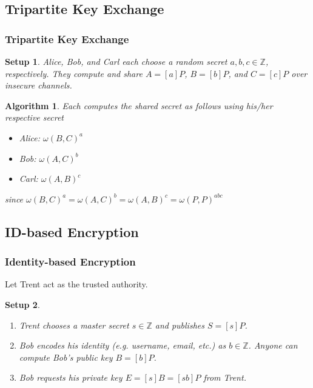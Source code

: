 \documentclass{beamer}
\newtheorem{algorithm}{Algorithm}
\newtheorem{setup}{Setup}
\begin{document}
    \subsection{Tripartite Key Exchange}
    \begin{frame}
        \frametitle{Tripartite Key Exchange}
        \begin{setup}
            Alice, Bob, and Carl each choose a random secret
            \(a, b, c \in \mathbb{Z}\), respectively. They compute and
            share \(A = [a]P\), \(B = [b]P\), and \(C = [c]P\)
            over insecure channels.
        \end{setup}
        \vfill
        \begin{algorithm}
            Each computes the shared secret as follows using his/her
            respective secret
            \begin{itemize}
                \item Alice: \(\omega(B, C)^a\)
                \item Bob: \(\omega(A, C)^b\)
                \item Carl: \(\omega(A, B)^c\)
            \end{itemize}
            since \(\omega(B, C)^a = \omega(A, C)^b = \omega(A, B)^c = 
                \omega(P, P)^{abc}\)
        \end{algorithm}
    \end{frame}

    \subsection{ID-based Encryption}
    \begin{frame}
        \frametitle{Identity-based Encryption}
        Let Trent act as the trusted authority.
        \vfill
        \begin{setup}
            \begin{enumerate}
                \item Trent chooses a master secret \(s \in \mathbb{Z}\) and
                    publishes \(S = [s]P\).
                \item Bob encodes his identity (e.g. username, email, etc.)
                    as \(b \in \mathbb{Z}\). Anyone can compute Bob's public
                    key \(B = [b]P\).
                \item Bob requests his private key
                    \(E = [s]B = [sb]P\) from Trent.
            \end{enumerate}
        \end{setup}
    \end{frame}
\end{document}
